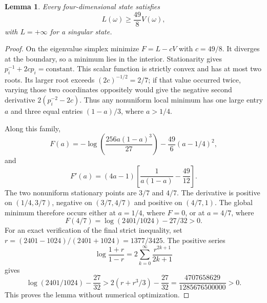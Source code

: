 \documentclass[11pt,a4paper]{article}
\newtheorem{lemma}{Lemma}
\begin{document}
\begin{lemma}\label{t3:lem:lower}
Every four-dimensional state satisfies
\[
 L(\omega)\ge\frac{49}{8}V(\omega),
\]
with $L=+\infty$ for a singular state.
\end{lemma}
\begin{proof}
On the eigenvalue simplex minimize $F=L-cV$ with $c=49/8$.
It diverges at the boundary, so a minimum lies in the interior.
Stationarity gives $p_i^{-1}+2cp_i=\mathrm{constant}$.
This scalar function is strictly convex and has at most two roots.
Its larger root exceeds $(2c)^{-1/2}=2/7$; if that value occurred
twice, varying those two coordinates oppositely would give the
negative second derivative $2(p_i^{-2}-2c)$.
Thus any nonuniform local minimum has one large entry $a$ and
three equal entries $(1-a)/3$, where $a>1/4$.

Along this family,
\[
 F(a)=-\log\!\left(\frac{256a(1-a)^3}{27}\right)
       -\frac{49}{6}(a-1/4)^2,
\]
and
\[
 F'(a)=(4a-1)\left[\frac1{a(1-a)}-\frac{49}{12}\right].
\]
The two nonuniform stationary points are $3/7$ and $4/7$.
The derivative is positive on $(1/4,3/7)$, negative on
$(3/7,4/7)$ and positive on $(4/7,1)$. The global minimum
therefore occurs either at $a=1/4$, where $F=0$, or at $a=4/7$,
where
\[
 F(4/7)=\log(2401/1024)-27/32>0.
\]
For an exact verification of the final strict inequality, set
$r=(2401-1024)/(2401+1024)=1377/3425$. The positive series
\[
 \log\frac{1+r}{1-r}=2\sum_{k=0}^\infty\frac{r^{2k+1}}{2k+1}
\]
gives
\[
 \log(2401/1024)-\frac{27}{32}
 >2(r+r^3/3)-\frac{27}{32}
 =\frac{4707658629}{1285676500000}>0.
\]
This proves the lemma without numerical optimization.
\end{proof}
\end{document}
